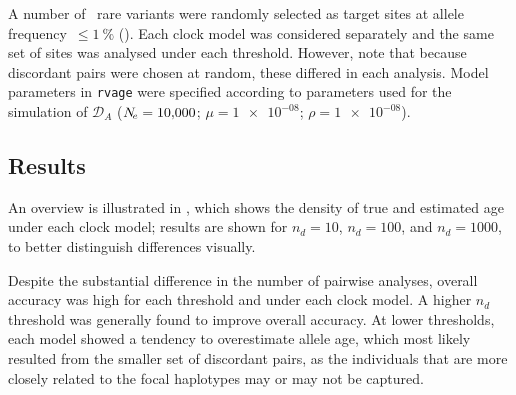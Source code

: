 A number of ~rare variants were randomly selected as target sites at allele frequency~${\leq \SI{1}{\percent}}$ (\fk{[2,20]}).
Each clock model was considered separately and the same set of sites was analysed under each threshold.
However, note that because discordant pairs were chosen at random, these differed in each analysis.
Model parameters in \texttt{rvage} were specified according to parameters used for the simulation of $\mathcal{D}_A$ (${N_{\!e}=\num{10000}}$; ${\mu=\num[round-precision=1]{1e-08}}$; ${\rho=\num[round-precision=1]{1e-08}}$).


%
\subsection{Results}
%


An overview is illustrated in , which shows the density of true and estimated age under each clock model; results are shown for ${n_d=\num{10}}$, ${n_d=\num{100}}$, and ${n_d=\num{1000}}$, to better distinguish differences visually.


%

%

Despite the substantial difference in the number of pairwise analyses, overall accuracy was high for each threshold and under each clock model.
A higher $n_d$ threshold was generally found to improve overall accuracy.
At lower thresholds, each model showed a tendency to overestimate allele age, which most likely resulted from the smaller set of discordant pairs, as the individuals that are more closely related to the focal haplotypes may or may not be captured.


